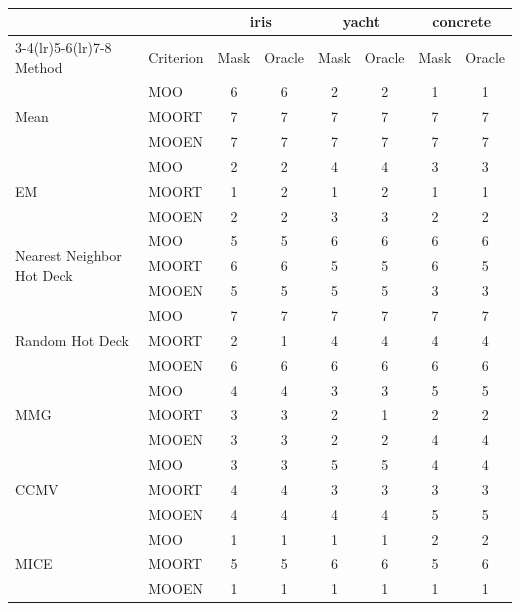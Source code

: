\documentclass[aos, preprint]{imsart}
\theoremstyle{plain}
\theoremstyle{definition}
\begin{document}
\begin{appendix}
\begin{table}[htbp!]
\\
\begin{tabular}{@{}llcccccc@{}}
\toprule
& & \multicolumn{2}{c}{iris} & \multicolumn{2}{c}{yacht} & \multicolumn{2}{c}{concrete} \\
\cmidrule(lr){3-4}\cmidrule(lr){5-6}\cmidrule(lr){7-8}
Method & Criterion & Mask & Oracle & Mask  & Oracle & Mask  & Oracle \\
\midrule
\multirow{3}{*}{Mean} 
 & MOO & 6 & 6 & 2 & 2 & 1 & 1\\
 & MOORT & 7 & 7 & 7 & 7 & 7 & 7\\
 & MOOEN & 7 & 7 & 7 & 7 & 7 & 7\\
\midrule
\multirow{3}{*}{EM} 
 & MOO & 2 & 2 & 4 & 4 & 3 & 3\\
 & MOORT & 1 & 2 & 1 & 2 & 1 & 1\\
 & MOOEN & 2 & 2 & 3 & 3 & 2 & 2\\
\midrule
\multirow{3}{*}{Nearest Neighbor Hot Deck} 
 & MOO & 5 & 5 & 6 & 6 & 6 & 6\\
 & MOORT & 6 & 6 & 5 & 5 & 6 & 5\\
 & MOOEN & 5 & 5 & 5 & 5 & 3 & 3\\
\midrule
\multirow{3}{*}{Random Hot Deck} 
 & MOO & 7 & 7 & 7 & 7 & 7 & 7\\
 & MOORT & 2 & 1 & 4 & 4 & 4 & 4\\
 & MOOEN & 6 & 6 & 6 & 6 & 6 & 6\\
\midrule
\multirow{3}{*}{MMG} 
 & MOO & 4 & 4 & 3 & 3 & 5 & 5\\
 & MOORT & 3 & 3 & 2 & 1 & 2 & 2\\
 & MOOEN & 3 & 3 & 2 & 2 & 4 & 4\\
\midrule
\multirow{3}{*}{CCMV} 
 & MOO & 3 & 3 & 5 & 5 & 4 & 4\\
 & MOORT & 4 & 4 & 3 & 3 & 3 & 3\\
 & MOOEN & 4 & 4 & 4 & 4 & 5 & 5\\
\midrule
\multirow{3}{*}{MICE} 
 & MOO & 1 & 1 & 1 & 1 & 2 & 2\\
 & MOORT & 5 & 5 & 6 & 6 & 5 & 6\\
 & MOOEN & 1 & 1 & 1 & 1 & 1 & 1\\
\bottomrule
\end{tabular}

\vspace{1em} 


\end{table}
\end{appendix}
\end{document}
